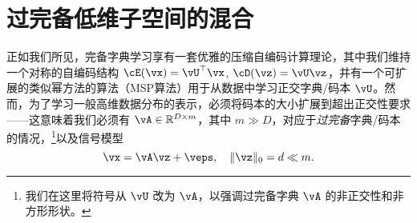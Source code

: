 \documentclass[../../book-main_zh.tex]{subfiles}
\begin{document}
%



%

\section{过完备低维子空间的混合}
\label{sec:dictionary_learning}
正如我们所见，完备字典学习享有一套优雅的压缩自编码计算理论，其中我们维持一个对称的自编码结构 $\cE(\vx) = \vU^\top \vx$, $\cD(\vz) = \vU \vz$，并有一个可扩展的类似幂方法的算法（MSP算法）用于从数据中学习正交字典/码本 $\vU$。然而，为了学习一般高维数据分布的表示，必须将码本的大小扩展到超出正交性要求——这意味着我们必须有 $\vA \in \R^{D \times m}$，其中 $m \gg D$，对应于\textit{过完备}字典/码本的情况，\footnote{我们在这里将符号从 $\vU$ 改为 $\vA$，以强调过完备字典 $\vA$ 的非正交性和非方形形状。}以及信号模型
\begin{equation}\label{eq:model-DL-overcomplete}
    \vx =  \vA \vz + \veps,
    \quad
    \norm{\vz}_0 = d \ll m.
\end{equation}
\end{document}
